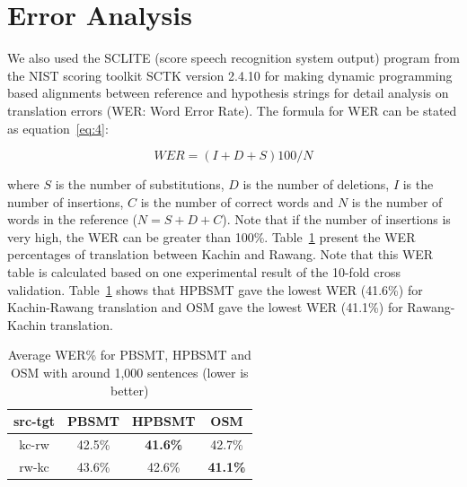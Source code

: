 \documentclass[conference]{IEEEtran}
\begin{document}
\section{Error Analysis}
\label{sec:errorAnalysis}

We also used the SCLITE (score speech recognition system output) program from the NIST scoring toolkit SCTK version 2.4.10 \cite{b26} for making dynamic programming based alignments between reference and hypothesis
strings for detail analysis on translation errors (WER: Word Error Rate). The formula for WER can be stated as equation~\ref{eq:4}:

\begin{equation} \label{eq:4}
WER=(I+D+S)100/N
\end{equation}

where $S$ is the number of substitutions, $D$ is the number of deletions, $I$ is the number of insertions, $C$ is the number of correct words and $N$ is the number of words in the reference ($N=S+D+C$). Note that if the number of insertions is very high, the WER can be greater than 100\%. Table~\ref{table:WER}  present the WER percentages of translation between Kachin and Rawang. Note that this WER table is calculated based on one experimental result of the 10-fold cross validation. Table~\ref{table:WER} shows that HPBSMT gave the lowest WER (41.6\%) for Kachin-Rawang translation and OSM gave the lowest WER (41.1\%) for Rawang-Kachin translation.


\begin{table}[h!]
\caption{\label{table:WER} Average WER\% for PBSMT, HPBSMT and OSM with around 1,000 sentences (lower is better)}
\begin{center}
\begin{tabular}{ |c|c|c|c| } 
 \hline
 \bf src-tgt & \bf PBSMT & \bf HPBSMT & \bf OSM \\[5pt]
 \hline
 kc-rw & 42.5\% & \bf 41.6\% & 42.7\%\\[5pt] 
 \hline
 rw-kc & 43.6\% & 42.6\% & \bf 41.1\%\\[5pt]
 \hline
\end{tabular}
\end{center}
\end{table}
\end{document}
